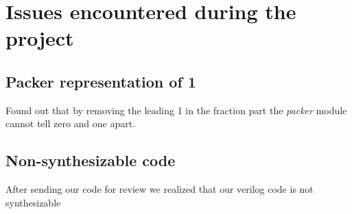 \documentclass[10pt]{article}
\begin{document}
\section{Issues encountered during the project}\label{sec:issu-enco-during}

\subsection{Packer representation of 1}
\label{sec:pack-repr-1}

Found out that by removing the leading 1 in the fraction part the
\textit{packer} module cannot tell zero and one apart.

\subsection{Non-synthesizable code}
\label{sec:non-synth-code}

After sending our code for review we realized that our verilog code is not synthesizable
\end{document}
